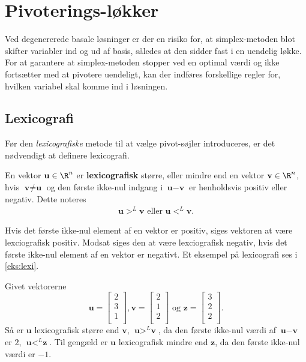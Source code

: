 \section{Pivoterings-løkker}
Ved degenererede basale løsninger er der en risiko for, at simplex-metoden blot skifter variabler ind og ud af basis, således at den sidder fast i en uendelig løkke.  
For at garantere at simplex-metoden stopper ved en optimal værdi og ikke fortsætter med at pivotere uendeligt, kan der indføres forskellige regler for, hvilken variabel skal komme ind i løsningen.

\subsection{Lexicografi}
%
Før den \textit{lexicografiske} metode til at vælge pivot-søjler introduceres, er det nødvendigt at definere lexicografi.
\begin{defn}{}{}
En vektor $\textbf{u}\in \R^n$ er \textbf{lexicografisk} større, eller mindre end en vektor $\textbf{v}\in \R^n$, hvis $\textbf{v} \neq \textbf{u}$ og den første ikke-nul indgang i $\textbf{u}-\textbf{v}$ er henholdsvis positiv eller negativ. Dette noteres
\begin{align*}
\textbf{u} >^L \textbf{v} \text{ eller } \textbf{u} <^L \textbf{v}.
\end{align*} 
\end{defn}
\noindent
Hvis det første ikke-nul element af en vektor er positiv, siges vektoren at være lexciografisk positiv. Modsat siges den at være lexciografisk negativ, hvis det første ikke-nul element af en vektor er negativt. Et eksempel på lexicografi ses i \ref{eks:lexi}.
\\
%
\begin{eks}\label{eks:lexi}
Givet vektorerne
$$\textbf{u}=
\begin{bmatrix}
2\\
3\\
1\\
\end{bmatrix}
,
\textbf{v}=
\begin{bmatrix}
2\\
1\\
2\\
\end{bmatrix}
\text{ og }
\textbf{z}=
\begin{bmatrix}
3\\
2\\
2\\
\end{bmatrix}
.$$
Så er $\textbf{u}$  lexicografisk større end $\textbf{v}$, $\textbf{u} >^L \textbf{v}$, da den første ikke-nul værdi af $\textbf{u}-\textbf{v}$ er $2$, $\textbf{u} <^L \textbf{z}$.
Til gengæld er $\textbf{u}$ lexicografisk mindre end $\textbf{z}$, da den første ikke-nul værdi er $-1$.
\end{eks}
